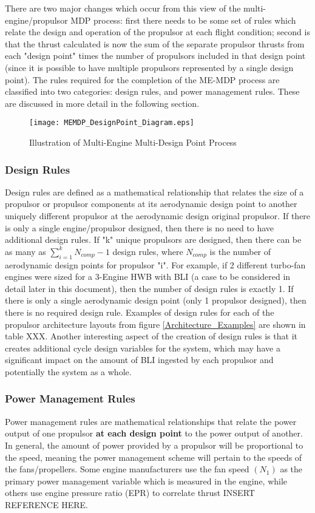 			There are two major changes which occur from this view of the multi-engine/propulsor MDP process:  first there needs to be some set of rules which relate the design and operation of the propulsor at each flight condition; second is that the thrust calculated is now the sum of the separate propulsor thrusts from each "design point" times the number of propulsors included in that design point (since it is possible to have multiple propulsors represented by a single design point).	The rules required for the completion of the ME-MDP process are classified into two categories:  design rules, and power management rules.  These are discussed in more detail in the following section.				
			
			\begin{figure}[htp]				
				\texttt{[image: MEMDP\_DesignPoint\_Diagram.eps]}
				\caption{Illustration of Multi-Engine Multi-Design Point Process}
				\label{MEMDP_DesignPoint_Diagram}
			\end{figure}
			
		\subsubsection{Design Rules}			
			Design rules are defined as a mathematical relationship that relates the size of a propulsor or propulsor components at its aerodynamic design point to another uniquely different propulsor at the aerodynamic design original propulsor.  If there is only a single engine/propulsor designed, then there is no need to have additional design rules.  If "k" unique propulsors are designed, then there can be as many as $\sum\limits_{i=1}^{k} N_{comp} - 1$ design rules, where $N_{comp}$ is the number of aerodynamic design points for propulsor "i".  For example, if 2 different turbo-fan engines were sized for a 3-Engine HWB with BLI (a case to be considered in detail later in this document), then the number of design rules is exactly 1.  If there is only a single aerodynamic design point (only 1 propulsor designed), then there is no required design rule.  Examples of design rules for each of the propulsor architecture layouts from figure \ref{Architecture_Examples} are shown in table XXX.  Another interesting aspect of the creation of design rules is that it creates additional cycle design variables for the system, which may have a significant impact on the amount of BLI ingested by each propulsor and potentially the system as a whole.						
		
		\subsubsection{Power Management Rules}
			Power management rules are mathematical relationships that relate the power output of one propulsor \textbf{at each design point} to the power output of another.  In general, the amount of power provided by a propulsor will be proportional to the speed, meaning the power management scheme will pertain to the speeds of the fans/propellers.  Some engine manufacturers use the fan speed $(N_1)$ as the primary power management variable which is measured in the engine, while others use engine pressure ratio (EPR) to correlate thrust INSERT REFERENCE HERE.
			
